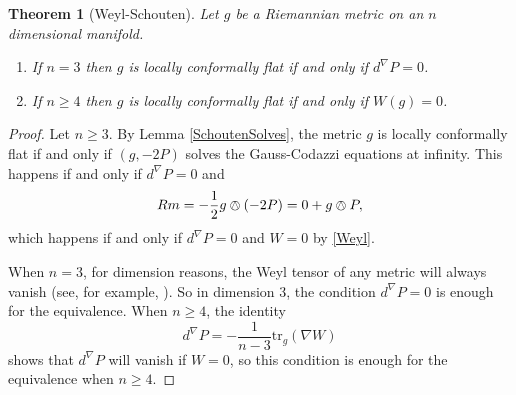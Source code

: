 \documentclass{amsart}
\newcommand{\tr}{\mathrm{tr}}
\newtheorem{thm}{Theorem}[section]
\numberwithin{equation}{section}
\begin{document}
\begin{thm}[Weyl-Schouten]
Let $g$ be a Riemannian metric on an $n$ dimensional manifold.

\begin{enumerate}
\item If $n = 3$ then $g$ is locally conformally flat if and only if $d^\nabla P = 0$.

\item If $n \geq 4$ then $g$ is locally conformally flat if and only if $W(g) = 0$.

\end{enumerate}
\end{thm}

\begin{proof}
Let $n \geq 3$. 
By Lemma \ref{SchoutenSolves}, the metric $g$ is locally conformally flat if and only if $(g,-2P)$ solves the Gauss-Codazzi equations at infinity.
This happens if and only if $d^{\nabla}P = 0$ and 
\[
Rm = -\frac{1}{2}g\owedge (-2P) = 0 + g \owedge P,
\]
which happens if and only if $d^\nabla P = 0$ and $W = 0$ by \eqref{Weyl}.

When $n = 3$, for dimension reasons, the Weyl tensor of any metric will always vanish (see, for example, \cite{Lee2018}).
So in dimension 3, the condition $d^\nabla P = 0$ is enough for the equivalence.
When $n \geq 4$, the identity
\[
d^\nabla P = -\frac{1}{n-3}\tr_g(\nabla W)
\]
shows that $d^\nabla P$ will vanish if $W=0$, so this condition is enough for the equivalence when $n\geq4$.
\end{proof}
\end{document}
